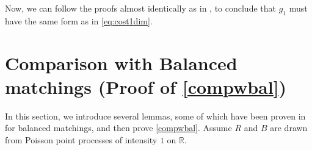 \documentclass{article}
\newcommand{\R}{\mathbb{R}}
\begin{document}
Now, we can follow the proofs almost identically as in
\cite[Lemma 21, Lemma 22, Proposition 18]{minimal}, to
conclude that $g_1$ must have the same form as in \eqref{eq:cost1dim}.

































\section{Comparison with Balanced matchings (Proof of
  \cref{compwbal})} \label{sec:compwbal}

In this section, we
introduce several lemmas, some of which have been proven in
\cite{minimal} for balanced matchings, and then prove \cref{compwbal}.
Assume $R$ and $B$ are drawn from Poisson point processes of intensity
$1$ on $\R$.
\end{document}

